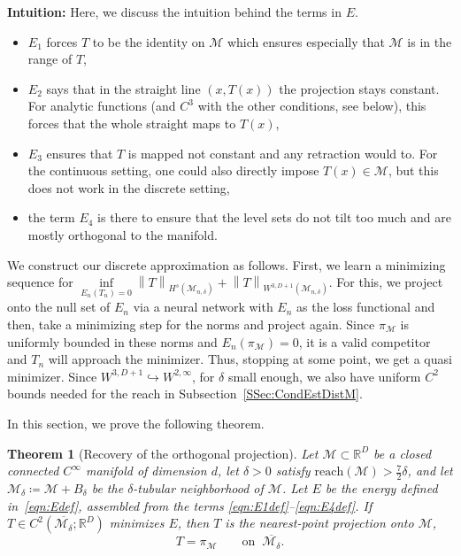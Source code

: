 \documentclass[11pt]{amsart}%
\newcommand{\norm}[1]{\left\lVert#1\right\rVert}
\theoremstyle{plain}
\newtheorem{theorem}[definition]{Theorem}
\newcommand{\R}{{\mathbb R}}
\newcommand{\1}{\mathbf{1}}
\newcommand{\M}{\mathcal{M}}
\begin{document}
\textbf{Intuition:} Here, we discuss the intuition behind the terms in $E$.
\begin{itemize}
    \item $E_1$ forces $T$ to be the identity on $\M$ which ensures especially that $\M$ is in the range of $T$,
    \item $E_2$ says that in the straight line $(x,T(x))$ the projection stays constant. For analytic functions (and $C^3$ with the other conditions, see below), this forces that the whole straight maps to $T(x)$,
    \item $E_3$ ensures that $T$ is mapped not constant and any retraction would to. For the continuous setting, one could also directly impose $T(x)\in \M$, but this does not work in the discrete setting,
    \item the term $E_4$ is there to ensure that the level sets do not tilt too much and are mostly orthogonal to the manifold.
\end{itemize}

We construct our discrete approximation as follows. First, we learn a minimizing sequence for $\inf\limits_{E_n(T_n)=0}\norm{T}_{H^s(\M_{n,\delta})}+\norm{T}_{W^{3,D+1}(\M_{n,\delta})}$. For this, we project onto the null set of $E_n$ via a neural network with $E_n$ as the loss functional and then, take a minimizing step for the norms and project again. Since $\pi_\M$ is uniformly bounded in these norms and $E_n(\pi_\M)=0$, it is a valid competitor and $T_n$ will approach the minimizer. Thus, stopping at some point, we get a quasi minimizer. Since $W^{3,D+1}\hookrightarrow W^{2,\infty}$, for $\delta$ small enough, we also have uniform $C^2$ bounds needed for the reach in Subsection~\ref{SSec:CondEstDistM}.

In this section, we prove the following theorem.

\begin{theorem}[Recovery of the orthogonal projection]
    \label{Thm:TPiM}
    Let $\M\subset\R^D$ be a closed connected $C^\infty$ manifold of dimension $d$, let $\delta>0$
    satisfy $\mathrm{reach}(\M)>\tfrac72\delta$, and let $\M_\delta\coloneqq \M+B_\delta$ be the
    $\delta$-tubular neighborhood of $\M$. Let $E$ be the energy defined
    in~\eqref{eqn:Edef}, assembled from the terms
    \eqref{eqn:E1def}--\eqref{eqn:E4def}. If $T\in C^2(\overline{\M_\delta};\R^D)$ minimizes $E$,
    then $T$ is the nearest-point projection onto $\M$,
    \[
        T=\pi_\M \qquad\text{on }\ \overline{\M_\delta}.
    \]
\end{theorem}
\end{document}
